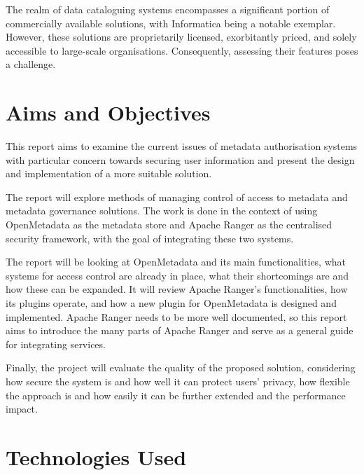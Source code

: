 The realm of data cataloguing systems encompasses a significant portion of commercially available solutions, with Informatica \cite{informaticaTech} being a notable exemplar. However, these solutions are proprietarily licensed, exorbitantly priced, and solely accessible to large-scale organisations. Consequently, assessing their features poses a challenge.

\section{\label{sec:project_goal} Aims and Objectives}

This report aims to examine the current issues of metadata authorisation systems with particular concern towards securing user information and present the design and implementation of a more suitable solution.

The report will explore methods of managing control of access to metadata and metadata governance solutions. The work is done in the context of using OpenMetadata as the metadata store and Apache Ranger as the centralised security framework, with the goal of integrating these two systems.

The report will be looking at OpenMetadata and its main functionalities, what systems for access control are already in place, what their shortcomings are and how these can be expanded. It will review Apache Ranger's functionalities, how its plugins operate, and how a new plugin for OpenMetadata is designed and implemented. Apache Ranger needs to be more well documented, so this report aims to introduce the many parts of Apache Ranger and serve as a general guide for integrating services.

Finally, the project will evaluate the quality of the proposed solution, considering how secure the system is and how well it can protect users' privacy, how flexible the approach is and how easily it can be further extended and the performance impact.

\section{Technologies Used}

